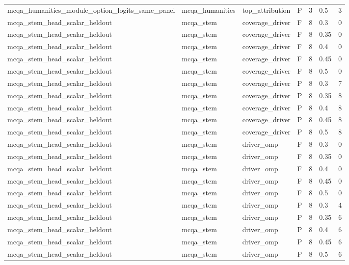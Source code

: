 \begin{tabular}{lllllll}
mcqa\_humanities\_module\_option\_logits\_same\_panel & mcqa\_humanities & top\_attribution & P & 3 & 0.5 & 3 \\
mcqa\_stem\_head\_scalar\_heldout & mcqa\_stem & coverage\_driver & F & 8 & 0.3 & 0 \\
mcqa\_stem\_head\_scalar\_heldout & mcqa\_stem & coverage\_driver & F & 8 & 0.35 & 0 \\
mcqa\_stem\_head\_scalar\_heldout & mcqa\_stem & coverage\_driver & F & 8 & 0.4 & 0 \\
mcqa\_stem\_head\_scalar\_heldout & mcqa\_stem & coverage\_driver & F & 8 & 0.45 & 0 \\
mcqa\_stem\_head\_scalar\_heldout & mcqa\_stem & coverage\_driver & F & 8 & 0.5 & 0 \\
mcqa\_stem\_head\_scalar\_heldout & mcqa\_stem & coverage\_driver & P & 8 & 0.3 & 7 \\
mcqa\_stem\_head\_scalar\_heldout & mcqa\_stem & coverage\_driver & P & 8 & 0.35 & 8 \\
mcqa\_stem\_head\_scalar\_heldout & mcqa\_stem & coverage\_driver & P & 8 & 0.4 & 8 \\
mcqa\_stem\_head\_scalar\_heldout & mcqa\_stem & coverage\_driver & P & 8 & 0.45 & 8 \\
mcqa\_stem\_head\_scalar\_heldout & mcqa\_stem & coverage\_driver & P & 8 & 0.5 & 8 \\
mcqa\_stem\_head\_scalar\_heldout & mcqa\_stem & driver\_omp & F & 8 & 0.3 & 0 \\
mcqa\_stem\_head\_scalar\_heldout & mcqa\_stem & driver\_omp & F & 8 & 0.35 & 0 \\
mcqa\_stem\_head\_scalar\_heldout & mcqa\_stem & driver\_omp & F & 8 & 0.4 & 0 \\
mcqa\_stem\_head\_scalar\_heldout & mcqa\_stem & driver\_omp & F & 8 & 0.45 & 0 \\
mcqa\_stem\_head\_scalar\_heldout & mcqa\_stem & driver\_omp & F & 8 & 0.5 & 0 \\
mcqa\_stem\_head\_scalar\_heldout & mcqa\_stem & driver\_omp & P & 8 & 0.3 & 4 \\
mcqa\_stem\_head\_scalar\_heldout & mcqa\_stem & driver\_omp & P & 8 & 0.35 & 6 \\
mcqa\_stem\_head\_scalar\_heldout & mcqa\_stem & driver\_omp & P & 8 & 0.4 & 6 \\
mcqa\_stem\_head\_scalar\_heldout & mcqa\_stem & driver\_omp & P & 8 & 0.45 & 6 \\
mcqa\_stem\_head\_scalar\_heldout & mcqa\_stem & driver\_omp & P & 8 & 0.5 & 6 \\

\end{tabular}
